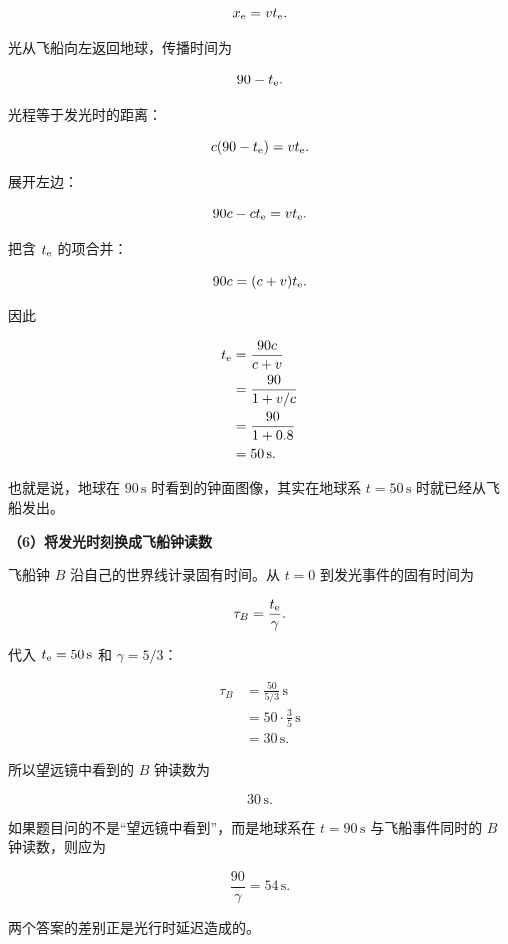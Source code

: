 \documentclass[12pt,a4paper,UTF8]{ctexart}
\begin{document}
\[
x_{\rm e}=vt_{\rm e}.
\]

光从飞船向左返回地球，传播时间为

\[
90-t_{\rm e}.
\]

光程等于发光时的距离：

\[
c(90-t_{\rm e})=vt_{\rm e}.
\]

展开左边：

\[
90c-ct_{\rm e}=vt_{\rm e}.
\]

把含 \(t_{\rm e}\) 的项合并：

\[
90c=(c+v)t_{\rm e}.
\]

因此

\[
\begin{aligned}
t_{\rm e}
&=\frac{90c}{c+v}\\
&=\frac{90}{1+v/c}\\
&=\frac{90}{1+0.8}\\
&=50\,\mathrm s.
\end{aligned}
\]

也就是说，地球在 \(90\,\mathrm s\) 时看到的钟面图像，其实在地球系
\(t=50\,\mathrm s\) 时就已经从飞船发出。

\textbf{（6）将发光时刻换成飞船钟读数}

飞船钟 \(B\) 沿自己的世界线计录固有时间。从 \(t=0\)
到发光事件的固有时间为

\[
\tau_B=\frac{t_{\rm e}}{\gamma}.
\]

代入 \(t_{\rm e}=50\,\mathrm s\) 和 \(\gamma=5/3\)：

\[
\begin{aligned}
\tau_B
&=\frac{50}{5/3}\,\mathrm s\\
&=50\cdot\frac35\,\mathrm s\\
&=30\,\mathrm s.
\end{aligned}
\]

所以望远镜中看到的 \(B\) 钟读数为

\[
\boxed{30\,\mathrm s}.
\]

如果题目问的不是``望远镜中看到''，而是地球系在 \(t=90\,\mathrm s\)
与飞船事件同时的 \(B\) 钟读数，则应为

\[
\frac{90}{\gamma}=54\,\mathrm s.
\]

两个答案的差别正是光行时延迟造成的。
\end{document}

